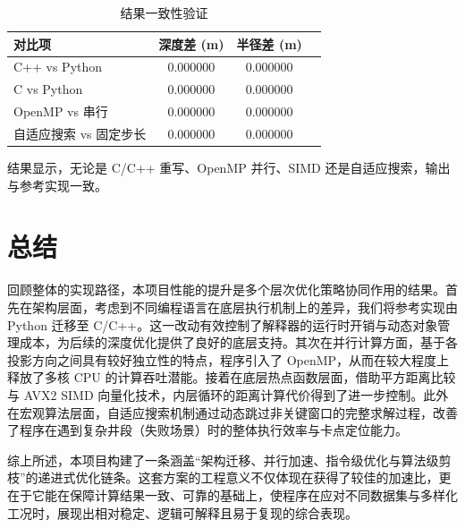 \documentclass[12pt]{article}
\begin{document}
\begin{table}[H]
  \centering
  \caption{结果一致性验证}
  \vspace{3mm}
  \begin{tabular}{lccc}
    \toprule
    \textbf{对比项} & \textbf{深度差 (m)} & \textbf{半径差 (m)} \\
    \midrule
    C++ vs Python & 0.000000 & 0.000000 \\
    C vs Python & 0.000000 & 0.000000 \\
    OpenMP vs 串行 & 0.000000 & 0.000000 \\
    自适应搜索 vs 固定步长 & 0.000000 & 0.000000 \\
    \bottomrule
  \end{tabular}
\end{table}

结果显示，无论是 C/C++ 重写、OpenMP 并行、SIMD 还是自适应搜索，输出与参考实现一致。

\section{总结}

回顾整体的实现路径，本项目性能的提升是多个层次优化策略协同作用的结果。首先在架构层面，考虑到不同编程语言在底层执行机制上的差异，我们将参考实现由 Python 迁移至 C/C++。这一改动有效控制了解释器的运行时开销与动态对象管理成本，为后续的深度优化提供了良好的底层支持。其次在并行计算方面，基于各投影方向之间具有较好独立性的特点，程序引入了 OpenMP，从而在较大程度上释放了多核 CPU 的计算吞吐潜能。接着在底层热点函数层面，借助平方距离比较与 AVX2 SIMD 向量化技术，内层循环的距离计算代价得到了进一步控制。此外在宏观算法层面，自适应搜索机制通过动态跳过非关键窗口的完整求解过程，改善了程序在遇到复杂井段（失败场景）时的整体执行效率与卡点定位能力。

综上所述，本项目构建了一条涵盖“架构迁移、并行加速、指令级优化与算法级剪枝”的递进式优化链条。这套方案的工程意义不仅体现在获得了较佳的加速比，更在于它能在保障计算结果一致、可靠的基础上，使程序在应对不同数据集与多样化工况时，展现出相对稳定、逻辑可解释且易于复现的综合表现。
\end{document}

